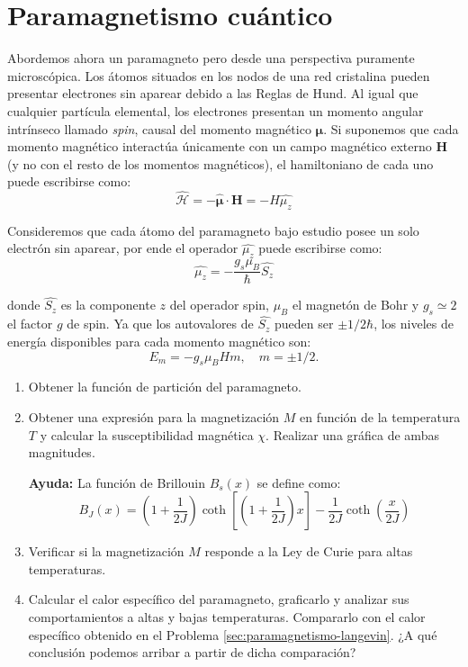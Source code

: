 \documentclass[a4paper,11pt]{article}
\begin{document}
\section{Paramagnetismo cuántico}
\label{sec:paramagnetismo-cuantico}

Abordemos ahora un paramagneto pero desde una perspectiva puramente 
microscópica. Los átomos situados en los nodos de una red cristalina pueden 
presentar electrones sin aparear debido a las Reglas de Hund. Al igual que 
cualquier partícula elemental, los electrones presentan un momento angular 
intrínseco llamado \emph{spin}, causal del momento magnético 
$\boldsymbol{\mu}$.
Si suponemos que cada momento magnético interactúa únicamente con un 
campo magnético externo $\textbf{H}$ (y no con el resto de los momentos 
magnéticos), el hamiltoniano de cada uno puede escribirse como:
$$ \hat{\mathcal{H}} = 
- \hat{\boldsymbol{\mu}} \cdot \textbf{H} = - H \hat{\mu_z} $$

Consideremos que cada átomo del paramagneto bajo estudio posee un solo 
electrón sin aparear, por ende el operador $\hat{\mu_z}$ puede 
escribirse como:
$$ \hat{\mu_z} = - \frac{g_s \mu_B}{\hbar} \hat{S_z} $$

donde $\hat{S_z}$ es la componente $z$ del operador spin, $\mu_B$ el 
magnetón de Bohr y $g_s \simeq 2$ el factor $g$ de spin. Ya que los 
autovalores de $\hat{S_z}$ pueden ser $\pm 1/2 \hbar$, los niveles de 
energía disponibles para cada momento magnético son: $$ E_m = - g_s 
\mu_B H m, \quad  m = \pm 1/2 .$$

\begin{enumerate}[label=(\alph*),
                  leftmargin=2\parindent,
                  rightmargin=2\parindent]

    \item{Obtener la función de partición del paramagneto.}

    \item{Obtener una expresión para la magnetización $M$ en función 
          de la temperatura $T$ y calcular la susceptibilidad magnética 
          $\chi$.
          Realizar una gráfica de ambas magnitudes.}
    
    {\small
    \textbf{Ayuda:} La función de Brillouin $B_s(x)$ se define como:
    $$ B_J(x)  = \left( 1 + \frac{1}{2J} \right)
    \coth \left[ \left( 1 + \frac{1}{2J} \right)x \right] -
    \frac{1}{2J} \coth \left( \frac{x}{2J} \right) $$
    }
    
    \item{Verificar si la magnetización $M$ responde a la Ley de Curie 
          para altas temperaturas.}

    \item{Calcular el calor específico del paramagneto, graficarlo y 
          analizar sus comportamientos a altas y bajas temperaturas. 
          Compararlo con el calor específico obtenido en el Problema 
          \ref{sec:paramagnetismo-langevin}.
          ¿A qué conclusión podemos arribar a partir de dicha 
          comparación?
          }

\end{enumerate}
\end{document}
